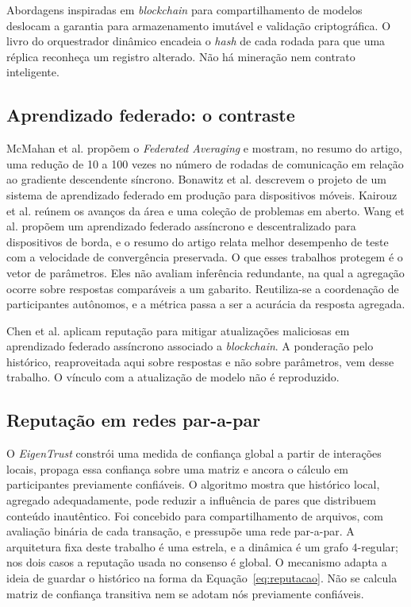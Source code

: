 \documentclass[12pt]{article}
\begin{document}
Abordagens inspiradas em \textit{blockchain} para compartilhamento de modelos \cite{blockchainAI2024} deslocam a garantia para armazenamento imutável e validação criptográfica. O livro do orquestrador dinâmico encadeia o \textit{hash} de cada rodada para que uma réplica reconheça um registro alterado. Não há mineração nem contrato inteligente.

\subsection{Aprendizado federado: o contraste}
\label{sec:eixo-fl}

McMahan et al. \cite{mcmahan2017} propõem o \textit{Federated Averaging} e mostram, no resumo do artigo, uma redução de 10 a 100 vezes no número de rodadas de comunicação em relação ao gradiente descendente síncrono. Bonawitz et al. \cite{bonawitz2019} descrevem o projeto de um sistema de aprendizado federado em produção para dispositivos móveis. Kairouz et al. \cite{kairouz2021} reúnem os avanços da área e uma coleção de problemas em aberto. Wang et al. \cite{wang2025} propõem um aprendizado federado assíncrono e descentralizado para dispositivos de borda, e o resumo do artigo relata melhor desempenho de teste com a velocidade de convergência preservada. O que esses trabalhos protegem é o vetor de parâmetros. Eles não avaliam inferência redundante, na qual a agregação ocorre sobre respostas comparáveis a um gabarito. Reutiliza-se a coordenação de participantes autônomos, e a métrica passa a ser a acurácia da resposta agregada.

Chen et al. \cite{chen2024} aplicam reputação para mitigar atualizações maliciosas em aprendizado federado assíncrono associado a \textit{blockchain}. A ponderação pelo histórico, reaproveitada aqui sobre respostas e não sobre parâmetros, vem desse trabalho. O vínculo com a atualização de modelo não é reproduzido.

\subsection{Reputação em redes par-a-par}
\label{sec:eixo-p2p}

O \textit{EigenTrust} \cite{kamvar2003} constrói uma medida de confiança global a partir de interações locais, propaga essa confiança sobre uma matriz e ancora o cálculo em participantes previamente confiáveis. O algoritmo mostra que histórico local, agregado adequadamente, pode reduzir a influência de pares que distribuem conteúdo inautêntico. Foi concebido para compartilhamento de arquivos, com avaliação binária de cada transação, e pressupõe uma rede par-a-par. A arquitetura fixa deste trabalho é uma estrela, e a dinâmica é um grafo 4-regular; nos dois casos a reputação usada no consenso é global. O mecanismo adapta a ideia de guardar o histórico na forma da Equação~\ref{eq:reputacao}. Não se calcula matriz de confiança transitiva nem se adotam nós previamente confiáveis.
\end{document}
